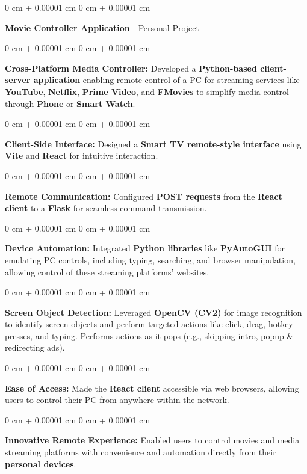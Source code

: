 \documentclass[10pt, letterpaper]{article}
\newenvironment{onecolentry}{
    \begin{adjustwidth}{
        0 cm + 0.00001 cm
    }{
        0 cm + 0.00001 cm
    }
}{
    \end{adjustwidth}
} %
\begin{document}
\vspace{0.20 cm}

\begin{onecolentry}
  \textbf{\large Movie Controller Application} - Personal Project
\end{onecolentry}
\begin{onecolentry}
  \textbf{Cross-Platform Media Controller:} Developed a \textbf{Python-based client-server application} enabling remote control of a PC for streaming services like \textbf{YouTube}, \textbf{Netflix}, \textbf{Prime Video}, and \textbf{FMovies} to simplify media control through \textbf{Phone} or \textbf{Smart Watch}.
\end{onecolentry}
\begin{onecolentry}
  \textbf{Client-Side Interface:} Designed a \textbf{Smart TV remote-style interface} using \textbf{Vite} and \textbf{React} for intuitive interaction.
\end{onecolentry}
\begin{onecolentry}
  \textbf{Remote Communication:} Configured \textbf{POST requests} from the \textbf{React client} to a \textbf{Flask} for seamless command transmission.
\end{onecolentry}
\begin{onecolentry}
  \textbf{Device Automation:} Integrated \textbf{Python libraries} like \textbf{PyAutoGUI} for emulating PC controls, including typing, searching, and browser manipulation, allowing control of these streaming platforms' websites.
\end{onecolentry}
\begin{onecolentry}
  \textbf{Screen Object Detection:} Leveraged \textbf{OpenCV (CV2)} for image recognition to identify screen objects and perform targeted actions like click, drag, hotkey presses, and typing. Performs actions as it pops (e.g., skipping intro, popup \& redirecting ads).
\end{onecolentry}
\begin{onecolentry}
  \textbf{Ease of Access:} Made the \textbf{React client} accessible via web browsers, allowing users to control their PC from anywhere within the network.
\end{onecolentry}
\begin{onecolentry}
  \textbf{Innovative Remote Experience:} Enabled users to control movies and media streaming platforms with convenience and automation directly from their \textbf{personal devices}.
\end{onecolentry}
\end{document}
